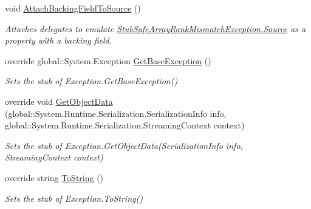 \begin{DoxyCompactItemize}
void \hyperlink{class_system_1_1_runtime_1_1_interop_services_1_1_fakes_1_1_stub_safe_array_rank_mismatch_exception_a6a9ee0f6e2894a3ef49a058d58c6531d}{Attach\-Backing\-Field\-To\-Source} ()
\begin{DoxyCompactList}\small\item\em Attaches delegates to emulate \hyperlink{class_system_1_1_runtime_1_1_interop_services_1_1_fakes_1_1_stub_safe_array_rank_mismatch_exception_a479ad9265e642fdffdf542879dfd5e23}{Stub\-Safe\-Array\-Rank\-Mismatch\-Exception.\-Source} as a property with a backing field.\end{DoxyCompactList}\item 
override global\-::\-System.\-Exception \hyperlink{class_system_1_1_runtime_1_1_interop_services_1_1_fakes_1_1_stub_safe_array_rank_mismatch_exception_a7842d94fc0388f01fe8b84f65a9b04e0}{Get\-Base\-Exception} ()
\begin{DoxyCompactList}\small\item\em Sets the stub of Exception.\-Get\-Base\-Exception()\end{DoxyCompactList}\item 
override void \hyperlink{class_system_1_1_runtime_1_1_interop_services_1_1_fakes_1_1_stub_safe_array_rank_mismatch_exception_a8019204d8190a1c7472f9b21b97d928a}{Get\-Object\-Data} (global\-::\-System.\-Runtime.\-Serialization.\-Serialization\-Info info, global\-::\-System.\-Runtime.\-Serialization.\-Streaming\-Context context)
\begin{DoxyCompactList}\small\item\em Sets the stub of Exception.\-Get\-Object\-Data(\-Serialization\-Info info, Streaming\-Context context)\end{DoxyCompactList}\item 
override string \hyperlink{class_system_1_1_runtime_1_1_interop_services_1_1_fakes_1_1_stub_safe_array_rank_mismatch_exception_a259c9007204391401fb941fba8f92975}{To\-String} ()
\begin{DoxyCompactList}\small\item\em Sets the stub of Exception.\-To\-String()\end{DoxyCompactList}\end{DoxyCompactItemize}
